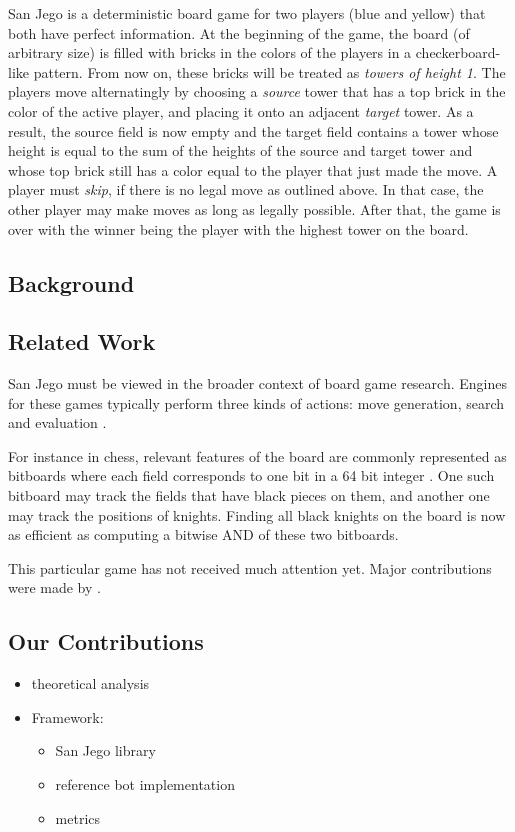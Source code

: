 \documentclass[sigconf]{acmart}
\begin{document}
San Jego is a deterministic board game for two players (blue and yellow) that both have perfect information.
At the beginning of the game, the board (of arbitrary size) is filled with bricks in the colors of the players in a checkerboard-like pattern.
From now on, these bricks will be treated as \emph{towers of height 1}.
The players move alternatingly by choosing a \emph{source} tower that has a top brick in the color of the active player, and placing it onto an adjacent \emph{target} tower.
As a result, the source field is now empty and the target field contains a tower whose height is equal to the sum of the heights of the source and target tower and whose top brick still has a color equal to the player that just made the move.
A player must \emph{skip}, if there is no legal move as outlined above.
In that case, the other player may make moves as long as legally possible.
After that, the game is over with the winner being the player with the highest tower on the board.


\subsection{Background}

\subsection{Related Work}
San Jego must be viewed in the broader context of board game research.
Engines for these games typically perform three kinds of actions: move generation, search and evaluation \cite{Bimonugroho2020}.

For instance in chess, relevant features of the board are commonly represented as bitboards where each field corresponds to one bit in a 64 bit integer \cite{Bimonugroho2020}.
One such bitboard may track the fields that have black pieces on them, and another one may track the positions of knights.
Finding all black knights on the board is now as efficient as computing a bitwise AND of these two bitboards.

This particular game has not received much attention yet.
Major contributions were made by \citeauthor{Althöfer2020} \cite{Althöfer2020}.

\subsection{Our Contributions}
\begin{itemize}
  \item theoretical analysis
  \item Framework:
  \begin{itemize}
    \item San Jego library
    \item reference bot implementation
    \item metrics
  \end{itemize}
\end{itemize}
\end{document}
